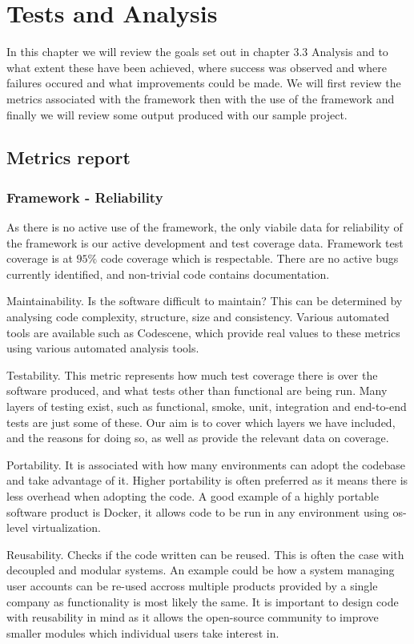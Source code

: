 \chapter{Tests and Analysis}
In this chapter we will review the goals set out in chapter 3.3 Analysis and to what extent these have been achieved, where success was observed and where failures occured and what improvements could be made.
We will first review the metrics associated with the framework then with the use of the framework and finally we will review some output produced with our sample project.
\section{Metrics report}
\subsection{Framework - Reliability}
As there is no active use of the framework, the only viabile data for reliability of the framework is our active development and test coverage data.
Framework test coverage is at \(95\%\) code coverage which is respectable.
There are no active bugs currently identified, and non-trivial code contains documentation.


Maintainability.
Is the software difficult to maintain?
This can be determined by analysing code complexity, structure, size and consistency.
Various automated tools are available such as Codescene, which provide real values to these metrics using various automated analysis tools.

Testability.
This metric represents how much test coverage there is over the software produced, and what tests other than functional are being run.
Many layers of testing exist, such as functional, smoke,  unit, integration and end-to-end tests are just some of these.
Our aim is to cover which layers we have included, and the reasons for doing so, as well as provide the relevant data on coverage.

Portability.
It is associated with how many environments can adopt the codebase and take advantage of it.
Higher portability is often preferred as it means there is less overhead when adopting the code.
A good example of a highly portable software product is Docker, it allows code to be run in any environment using os-level virtualization.

Reusability.
Checks if the code written can be reused.
This is often the case with decoupled and modular systems.
An example could be how a system managing user accounts can be re-used accross multiple products provided by a single company as functionality is most likely the same.
It is important to design code with reusability in mind as it allows the open-source community to improve smaller modules which individual users take interest in.



